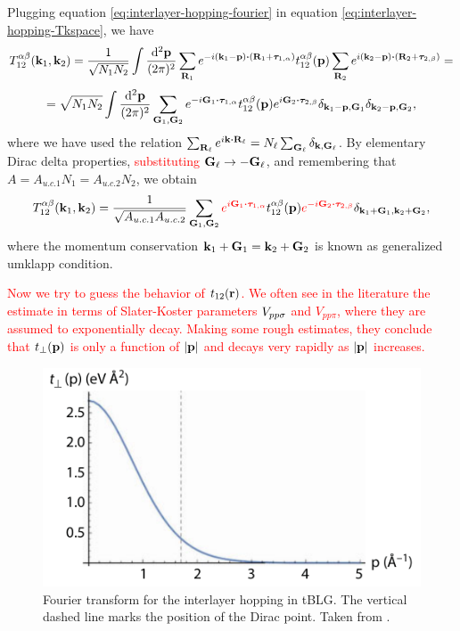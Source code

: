 Plugging equation \ref{eq:interlayer-hopping-fourier} in equation \ref{eq:interlayer-hopping-Tkspace}, we have
$$
T_{12}^{\alpha\beta}(\k_1,\k_2) = \frac{1}{\sqrt{N_1 N_2}} \int \frac{\dd[2]{\p}}{(2\pi)^2}
\sum_{\R_1} e^{-i(\k_1-\p)\vdot(\R_1+\vtau_{1,\alpha})} t_{12}^{\alpha\beta}(\p)
\sum_{\R_2} e^{i(\k_2-\p)\vdot(\R_2+\vtau_{2,\beta})} =
$$
$$
= \sqrt{N_1 N_2} \int \frac{\dd[2]{\p}}{(2\pi)^2}
\sum_{\G_1, \G_2} e^{-i\G_1\vdot\vtau_{1,\alpha}} t_{12}^{\alpha\beta}(\p)
e^{i\G_2\vdot\vtau_{2,\beta}} \delta_{\k_1-\p,\G_1} \delta_{\k_2-\p,\G_2},
$$
where we have used the relation $\sum_{\R_\ell} e^{i\k\vdot\R_\ell} = N_\ell \sum_{\G_\ell} \delta_{\k,\G_\ell}$. By elementary Dirac delta properties, \textcolor{red}{substituting ${\vb{G}}_\ell \to -{\vb{G}}_\ell$}, and remembering that $A = A_{u.c.1} N_1 = A_{u.c.2} N_2$, we obtain
\begin{equation} \label{eq:interlayer-hopping-simplified}
T_{12}^{\alpha\beta}(\k_1,\k_2) = \frac{1}{\sqrt{A_{u.c.1} A_{u.c.2}}}
\sum_{\G_1, \G_2} \textcolor{red}{e^{i\G_1\vdot\vtau_{1,\alpha}}} t_{12}^{\alpha\beta}(\p)
\textcolor{red}{e^{-i\G_2\vdot\vtau_{2,\beta}}} \delta_{\k_1+\G_1, \k_2+\G_2},
\end{equation}
where the momentum conservation $ {\vb{k}}_1 + {\vb{G}}_1 = {\vb{k}}_2 + {\vb{G}}_2 $ is known as generalized umklapp condition.

\n

\textcolor{red}{
Now we try to guess the behavior of $t_{12}({\vb{r}})$. We often see in the literature the estimate in terms of Slater-Koster parameters $V_{pp\sigma}$ and $V_{pp\pi}$, where they are assumed to exponentially decay. Making some rough estimates, they conclude that $t_\perp({\vb{p}})$ is only a function of $\abs{{\vb{p}}}$ and decays very rapidly as $\abs{{\vb{p}}}$ increases.
}

\begin{figure}[H]
\centering
\includegraphics[width=0.6\linewidth]{fig/tperp.png}
\caption{Fourier transform for the interlayer hopping in tBLG. The vertical dashed line marks the position
of the Dirac point. Taken from \cite{handbook2019}.}
\label{fig:tperp}
\end{figure}

